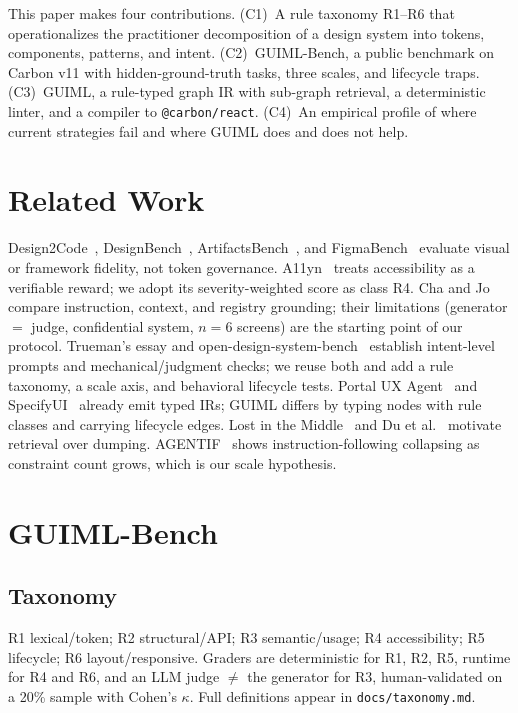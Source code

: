 \documentclass[journal]{IEEEtran}
\begin{document}
This paper makes four contributions. (C1)~A rule taxonomy R1--R6 that operationalizes the practitioner decomposition of a design system into tokens, components, patterns, and intent. (C2)~GUIML-Bench, a public benchmark on Carbon v11 with hidden-ground-truth tasks, three scales, and lifecycle traps. (C3)~GUIML, a rule-typed graph IR with sub-graph retrieval, a deterministic linter, and a compiler to \texttt{@carbon/react}. (C4)~An empirical profile of where current strategies fail and where GUIML does and does not help.

\section{Related Work}
Design2Code~\cite{si2025}, DesignBench~\cite{designbench}, ArtifactsBench~\cite{artifactsbench}, and FigmaBench~\cite{figmabench} evaluate visual or framework fidelity, not token governance. A11yn~\cite{a11yn} treats accessibility as a verifiable reward; we adopt its severity-weighted score as class R4. Cha and Jo~\cite{cha2026} compare instruction, context, and registry grounding; their limitations (generator $=$ judge, confidential system, $n{=}6$ screens) are the starting point of our protocol. Trueman's essay and open-design-system-bench~\cite{odsb} establish intent-level prompts and mechanical/judgment checks; we reuse both and add a rule taxonomy, a scale axis, and behavioral lifecycle tests. Portal UX Agent~\cite{portal} and SpecifyUI~\cite{specifyui} already emit typed IRs; GUIML differs by typing nodes with rule classes and carrying lifecycle edges. Lost in the Middle~\cite{liu2024} and Du et al.~\cite{du2025} motivate retrieval over dumping. AGENTIF~\cite{agentif} shows instruction-following collapsing as constraint count grows, which is our scale hypothesis.

\section{GUIML-Bench}
\subsection{Taxonomy}
R1 lexical/token; R2 structural/API; R3 semantic/usage; R4 accessibility; R5 lifecycle; R6 layout/responsive. Graders are deterministic for R1, R2, R5, runtime for R4 and R6, and an LLM judge $\neq$ the generator for R3, human-validated on a 20\% sample with Cohen's $\kappa$. Full definitions appear in \texttt{docs/taxonomy.md}.
\end{document}
